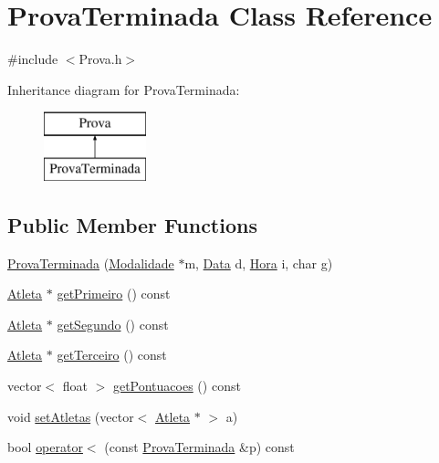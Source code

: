 \hypertarget{class_prova_terminada}{}\section{Prova\+Terminada Class Reference}
\label{class_prova_terminada}


{\ttfamily \#include $<$Prova.\+h$>$}

Inheritance diagram for Prova\+Terminada\+:\begin{figure}[H]
\begin{center}
\leavevmode
\includegraphics[height=2.000000cm]{class_prova_terminada}
\end{center}
\end{figure}
\subsection*{Public Member Functions}
\begin{DoxyCompactItemize}
\item 
\hyperlink{class_prova_terminada_a273ba377768056d52dc71770d91c860c}{Prova\+Terminada} (\hyperlink{class_modalidade}{Modalidade} $\ast$m, \hyperlink{class_data}{Data} d, \hyperlink{class_hora}{Hora} i, char g)
\item 
\hyperlink{class_atleta}{Atleta} $\ast$ \hyperlink{class_prova_terminada_aa66bb50f4a969d6a4795bb39595705d8}{get\+Primeiro} () const 
\item 
\hyperlink{class_atleta}{Atleta} $\ast$ \hyperlink{class_prova_terminada_a3117799dd3ddb513442376203f0ea035}{get\+Segundo} () const 
\item 
\hyperlink{class_atleta}{Atleta} $\ast$ \hyperlink{class_prova_terminada_a332c8f4466c18f153a3ebf7347ab944a}{get\+Terceiro} () const 
\item 
vector$<$ float $>$ \hyperlink{class_prova_terminada_a449d07fa099785eda45301303792b6b0}{get\+Pontuacoes} () const 
\item 
void \hyperlink{class_prova_terminada_a189ef4830e8e6dbe3e50153bdc28b1ed}{set\+Atletas} (vector$<$ \hyperlink{class_atleta}{Atleta} $\ast$ $>$ a)
\item 
bool \hyperlink{class_prova_terminada_afe024233747b571f92080b6fc325b6a5}{operator$<$} (const \hyperlink{class_prova_terminada}{Prova\+Terminada} \&p) const 
\end{DoxyCompactItemize}
